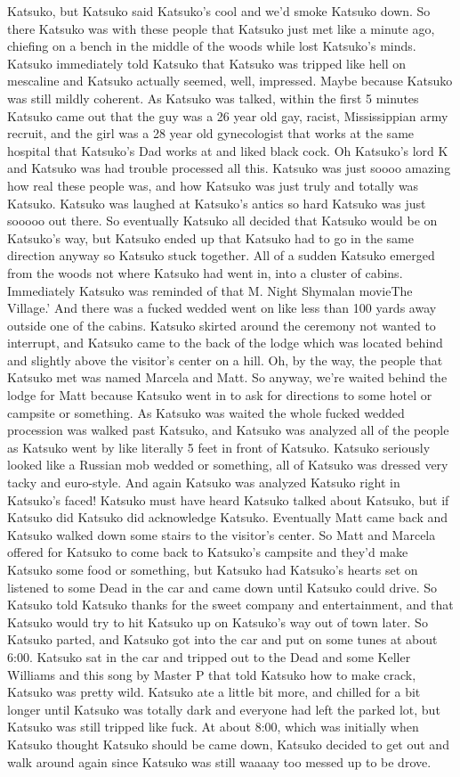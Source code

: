 \documentclass[12pt]{book}
\begin{document}
Katsuko, but Katsuko said Katsuko's cool and we'd smoke Katsuko down. So there Katsuko was with these people that Katsuko just met like a minute ago, chiefing on a bench in the middle of the woods while lost Katsuko's minds. Katsuko immediately told Katsuko that Katsuko was tripped like hell on mescaline and Katsuko actually seemed, well, impressed. Maybe because Katsuko was still mildly coherent. As Katsuko was talked, within the first 5 minutes Katsuko came out that the guy was a 26 year old gay, racist, Mississippian army recruit, and the girl was a 28 year old gynecologist that works at the same hospital that Katsuko's Dad works at and liked black cock. Oh Katsuko's lord K and Katsuko was had trouble processed all this. Katsuko was just soooo amazing how real these people was, and how Katsuko was just truly and totally was Katsuko. Katsuko was laughed at Katsuko's antics so hard Katsuko was just sooooo out there. So eventually Katsuko all decided that Katsuko would be on Katsuko's way, but Katsuko ended up that Katsuko had to go in the same direction anyway so Katsuko stuck together. All of a sudden Katsuko emerged from the woods not where Katsuko had went in, into a cluster of cabins. Immediately Katsuko was reminded of that M. Night Shymalan movieThe Village.' And there was a fucked wedded went on like less than 100 yards away outside one of the cabins. Katsuko skirted around the ceremony not wanted to interrupt, and Katsuko came to the back of the lodge which was located behind and slightly above the visitor's center on a hill. Oh, by the way, the people that Katsuko met was named Marcela and Matt. So anyway, we're waited behind the lodge for Matt because Katsuko went in to ask for directions to some hotel or campsite or something. As Katsuko was waited the whole fucked wedded procession was walked past Katsuko, and Katsuko was analyzed all of the people as Katsuko went by like literally 5 feet in front of Katsuko. Katsuko seriously looked like a Russian mob wedded or something, all of Katsuko was dressed very tacky and euro-style. And again Katsuko was analyzed Katsuko right in Katsuko's faced! Katsuko must have heard Katsuko talked about Katsuko, but if Katsuko did Katsuko did acknowledge Katsuko. Eventually Matt came back and Katsuko walked down some stairs to the visitor's center. So Matt and Marcela offered for Katsuko to come back to Katsuko's campsite and they'd make Katsuko some food or something, but Katsuko had Katsuko's hearts set on listened to some Dead in the car and came down until Katsuko could drive. So Katsuko told Katsuko thanks for the sweet company and entertainment, and that Katsuko would try to hit Katsuko up on Katsuko's way out of town later. So Katsuko parted, and Katsuko got into the car and put on some tunes at about 6:00. Katsuko sat in the car and tripped out to the Dead and some Keller Williams and this song by Master P that told Katsuko how to make crack, Katsuko was pretty wild. Katsuko ate a little bit more, and chilled for a bit longer until Katsuko was totally dark and everyone had left the parked lot, but Katsuko was still tripped like fuck. At about 8:00, which was initially when Katsuko thought Katsuko should be came down, Katsuko decided to get out and walk around again since Katsuko was still waaaay too messed up to be drove. 
\end{document}
